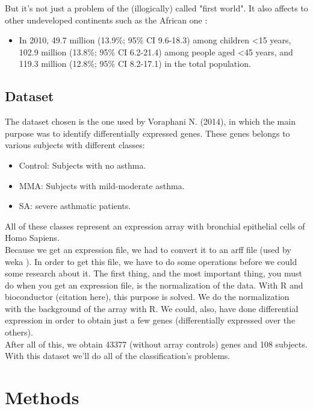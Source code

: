 \documentclass[conference,a4paper]{IEEEtran}
\begin{document}
But it's not just a problem of the (illogically) called "first world". It also affects to other undeveloped continents such as the African one \cite{asthmaAfrica}:

\begin{itemize}
	\item In 2010, 49.7 million (13.9\%; 95\% CI 9.6-18.3) among children <15 years, 102.9 million (13.8\%; 95\% CI 6.2-21.4) among people aged <45 years, and 119.3 million (12.8\%; 95\% CI 8.2-17.1) in the total population.
\end{itemize}


\subsection{Dataset}

The dataset chosen is the one used by Voraphani N. (2014)\cite{voraphani2014}, in which the main purpose was to identify differentially expressed genes. These genes belongs to various subjects with different classes:

\begin{itemize}
	\item Control: Subjects with no asthma.
	
	\item MMA: Subjects with mild-moderate asthma.
	
	\item SA: severe asthmatic patients.
\end{itemize}

All of these classes represent an expression array with bronchial epithelial cells of Homo Sapiens.
\\
Because we get an expression file, we had to convert it to an arff file (used by weka \cite{weka}). In order to get this file, we have to do some operations before we could some research about it. The first thing, and the most important thing, you must do when you get an expression file, is the normalization of the data. With R and bioconductor \cite{bionductor} (citation here), this purpose is solved. We do the normalization with the background of the array with R.
We could, also, have done differential expression in order to obtain just a few genes (differentially expressed over the others).
\\
After all of this, we obtain 43377 (without array controls) genes and 108 subjects. With this dataset we'll do all of the classification's problems.

\section{Methods}
\end{document}
